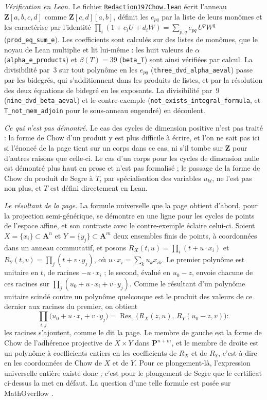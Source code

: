 \begin{sloppypar}
\emph{Vérification en Lean.} Le fichier \href{\leanblobmain/Redaction197Chow.lean}{\texttt{Redaction197Chow.\allowbreak{}lean}} écrit l'anneau $\mathbf Z[a, b, c, d]$ comme $\mathbf Z[c, d][a, b]$, définit les $e_{pq}$ par la liste de leurs monômes et les caractérise par l'identité $\prod_i (1 + c_i U + d_i W) = \sum_{p,q} e_{pq}\, U^p W^q$ (\texttt{prod\_eq\_sum\_e}). Les coefficients sont calculés sur des listes de monômes, que le noyau de Lean multiplie et lit lui-même : les huit valeurs de $\alpha$ (\texttt{alpha\_e\_products}) et $\beta(T) = 39$ (\texttt{beta\_T}) sont ainsi vérifiées par calcul. La divisibilité par~$3$ sur tout polynôme en les $e_{pq}$ (\texttt{three\_dvd\_alpha\_aeval}) passe par les bidegrés, qui s'additionnent dans les produits de listes, et par la résolution des deux équations de bidegré en les exposants. La divisibilité par~$9$ (\texttt{nine\_dvd\_beta\_aeval}) et le contre-exemple (\texttt{not\_exists\_integral\_formula}, et \texttt{T\_not\_mem\_adjoin} pour le sous-anneau engendré) en découlent.
\end{sloppypar}

\emph{Ce qui n'est pas démontré.} Le cas des cycles de dimension positive n'est pas traité : la forme de Chow d'un produit y est plus difficile à écrire, et l'on ne sait pas ici si l'énoncé de la page tient sur un corps dans ce cas, ni s'il tombe sur $\mathbf Z$ pour d'autres raisons que celle-ci. Le cas d'un corps pour les cycles de dimension nulle est démontré plus haut en prose et n'est pas formalisé ; le passage de la forme de Chow du produit de Segre à $T$, par spécialisation des variables $u_{kl}$, ne l'est pas non plus, et $T$ est défini directement en Lean.

\emph{Le résultant de la page.} La formule universelle que la page obtient d'abord, pour la projection semi-générique, se démontre en une ligne pour les cycles de points de l'espace affine, et son contraste avec le contre-exemple éclaire celui-ci. Soient $X = \{x_i\} \subset \mathbf A^n$ et $Y = \{y_j\} \subset \mathbf A^m$ deux ensembles finis de points, à coordonnées dans un anneau commutatif, et posons $R_X(t, u) = \prod_i (t + u \cdot x_i)$ et $R_Y(t, v) = \prod_j (t + v \cdot y_j)$, où $u \cdot x_i = \sum_k u_k x_{ik}$. Le premier polynôme est unitaire en $t$, de racines $-u\cdot x_i$ ; le second, évalué en $u_0 - z$, envoie chacune de ces racines sur $\prod_j (u_0 + u \cdot x_i + v \cdot y_j)$. Comme le résultant d'un polynôme unitaire scindé contre un polynôme quelconque est le produit des valeurs de ce dernier aux racines du premier, on obtient
\[
\prod_{i,j} \bigl(u_0 + u \cdot x_i + v \cdot y_j\bigr) = \operatorname{Res}_z\bigl(R_X(z, u),\, R_Y(u_0 - z, v)\bigr) :
\]
les racines s'ajoutent, comme le dit la page. Le membre de gauche est la forme de Chow de l'adhérence projective de $X \times Y$ dans $\mathbf P^{n+m}$, et le membre de droite est un polynôme à coefficients entiers en les coefficients de $R_X$ et de $R_Y$, c'est-à-dire en les coordonnées de Chow de $X$ et de $Y$. Pour ce plongement-là, l'expression universelle entière existe donc ; c'est pour le plongement de Segre que le certificat ci-dessus la met en défaut. La question d'une telle formule est posée sur MathOverflow \cite{mo354568}.

